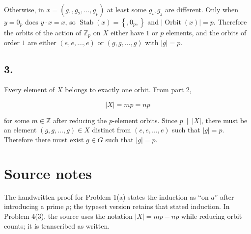 Otherwise, in \(x = \left( {g_{1},g_{2},\ldots,g_{p}} \right)\) at least some \(g_{i},g_{j}\) are different. Only when \(y = 0_{p}\) does \(y \cdot x = x\), so \(\operatorname{Stab}(x) = \left\{ {,0_{p},} \right\}\) and \(\left| {\operatorname{Orbit}(x)} \right| = p\). Therefore the orbits of the action of \(\mathbb{Z}_{p}\) on \(X\) either have \(1\) or \(p\) elements, and the orbits of order \(1\) are either \(\left( {e,e,\ldots,e} \right)\) or \(\left( {g,g,\ldots,g} \right)\) with \(|g| = p\).

\subsection{3.}

Every element of \(X\) belongs to exactly one orbit. From part 2,

\[|X| = mp = np\]

for some \(m \in \mathbb{Z}\) after reducing the \(p\)-element orbits. Since \(\left. p\  \middle| \ |X| \right.\), there must be an element \(\left( {g,g,\ldots,g} \right) \in X\) distinct from \(\left( {e,e,\ldots,e} \right)\) such that \(|g| = p\). Therefore there must exist \(g \in G\) such that \(|g| = p\).

\section{Source notes}

The handwritten proof for Problem 1(a) states the induction as ``on \(a\)'' after introducing a prime \(p\); the typeset version retains that stated induction. In Problem 4(3), the source uses the notation \(|X| = mp - np\) while reducing orbit counts; it is transcribed as written.
